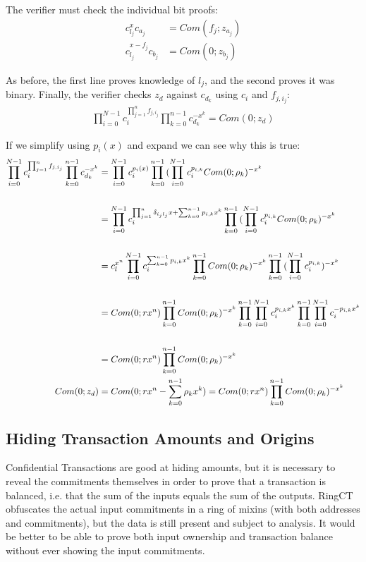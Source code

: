 \documentclass{article}
\begin{document}
The verifier must check the individual bit proofs:
\begin{align}
  c_{l_j}^x c_{a_j} &= Com(f_j; z_{a_j})\\
  c_{l_j}^{x-f_j} c_{b_j} &= Com(0; z_{b_j})
\end{align}
    
As before, the first line proves knowledge of $l_j$, and the second proves it was binary.  Finally, the verifier checks $z_d$ against $c_{d_k}$ using $c_i$ and $f_{j,i_j}$:
\begin{align}
  \prod_{i=0}^{N-1}{c_i^{\prod_{j=1}^{n}{f_{j,i_j}}}} \prod_{k=0}^{n-1}{c_{d_k}^{-x^k}} = Com(0; z_d)
\end{align}

If we simplify using $p_i(x)$ and expand we can see why this is true:
\begin{align}
  \prod_{i=0}^{N-1}{c_i^{\prod_{j=1}^{n}{f_{j,i_j}}}} \prod_{k=0}^{n-1}{c_{d_k}^{-x^k}} &= \prod_{i=0}^{N-1}{c_i^{p_i(x)}} \prod_{k=0}^{n-1}{(\prod_{i=0}^{N-1}{c_i^{p_{i,k}}} Com(0; \rho_k)^{-x^k}}\\
  \cr &= \prod_{i=0}^{N-1}{c_i^{  \prod_{j=1}^{n}{\delta_{i_jl_j} x} + \sum_{k=0}^{n-1}{p_{i,k} x^k}   }} \prod_{k=0}^{n-1}{(\prod_{i=0}^{N-1}{c_i^{p_{i,k}}} Com(0; \rho_k)^{-x^k}}\\
  \cr &= c_l^{x^n} \prod_{i=0}^{N-1}{c_i^{ \sum_{k=0}^{n-1}{p_{i,k} x^k}   }}     \prod_{k=0}^{n-1}{ Com(0; \rho_k)^{-x^k}}         \prod_{k=0}^{n-1}{(\prod_{i=0}^{N-1}{c_i^{p_{i,k}}})^{-x^k}}\\
  \cr &= Com(0; r x^n) \prod_{k=0}^{n-1}{ Com(0; \rho_k)^{-x^k}}      \prod_{k=0}^{n-1}{\prod_{i=0}^{N-1}{c_i^{p_{i,k}  x^k}}}          \prod_{k=0}^{n-1}{\prod_{i=0}^{N-1}{c_i^{-p_{i,k} x^k}}}\\
  \cr &= Com(0; r x^n) \prod_{k=0}^{n-1}{ Com(0; \rho_k)^{-x^k}}\\
  Com(0; z_d) &= Com(0; rx^n - \sum_{k=0}^{n-1}{\rho_k x^k}) = Com(0; rx^n) \prod_{k=0}^{n-1}{Com(0; \rho_k)^{-x^k}}
\end{align}


\subsection{Hiding Transaction Amounts and Origins}
 
Confidential Transactions are good at hiding amounts, but it is necessary to reveal the commitments themselves in order to prove that a transaction is balanced, i.e. that the sum of the inputs equals the sum of the outputs.  RingCT obfuscates the actual input commitments in a ring of mixins (with both addresses and commitments), but the data is still present and subject to analysis.  It would be better to be able to prove both input ownership and transaction balance without ever showing the input commitments.
\end{document}
